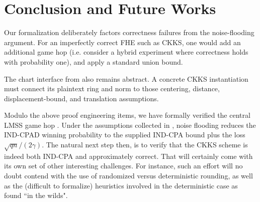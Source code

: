 \section{Conclusion and Future Works}
\label{sec:limitations}

Our formalization deliberately factors correctness failures from the noise-flooding argument.
For an imperfectly correct FHE such as CKKS,
one would add an additional game hop (i.e. consider a hybrid experiment where correctness holds with probability one),
and apply a standard union bound.

The chart interface from  also remains abstract.
A concrete CKKS instantiation must connect its plaintext ring and norm to those
centering, distance, displacement-bound, and translation assumptions.

Modulo the above proof engineering items, we have formally verified the central LMSS game hop \cite{lmss}.
Under the assumptions collected in , noise flooding
reduces the IND-CPAD winning probability to the supplied IND-CPA bound plus
the loss \(\sqrt{qn}/(2\gamma)\).
The natural next step then, is to verify that the CKKS scheme is indeed both IND-CPA and approximately correct.
That will certainly come with its own set of other interesting challenges.
For instance, such an effort will no doubt contend with the use of randomized versus deterministic rounding, as well as the (difficult to formalize) heuristics involved in the deterministic case as found ``in the wilds".
